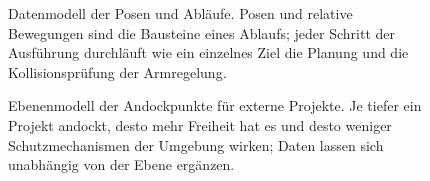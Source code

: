 \begin{figure}[htbp]
  \centering
  
  \caption[Datenmodell der Posen und Abläufe]{Datenmodell der Posen und Abläufe. Posen und relative Bewegungen sind die Bausteine eines Ablaufs; jeder Schritt der Ausführung durchläuft wie ein einzelnes Ziel die Planung und die Kollisionsprüfung der Armregelung.}
  \label{fig:posen_ablaeufe}
\end{figure}

\begin{figure}[htbp]
  \centering
  
  \caption[Ebenenmodell der Andockpunkte]{Ebenenmodell der Andockpunkte für externe Projekte. Je tiefer ein Projekt andockt, desto mehr Freiheit hat es und desto weniger Schutzmechanismen der Umgebung wirken; Daten lassen sich unabhängig von der Ebene ergänzen.}
  \label{fig:andockpunkte}
\end{figure}

